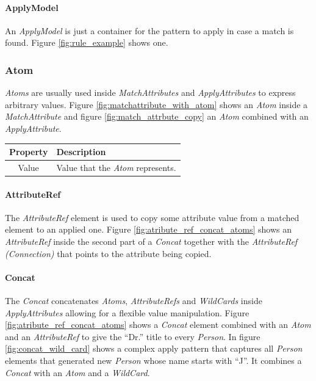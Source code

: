 \paragraph{ApplyModel}

An \emph{ApplyModel} is just a container for the pattern to apply in case a
match is found. Figure \ref{fig:rule_example} shows one.



\subsubsection{Atom}

\emph{Atoms} are usually used inside \emph{MatchAttributes} and
\emph{ApplyAttributes}  to express arbitrary values. Figure
\ref{fig:matchattribute_with_atom} shows an \emph{Atom} inside a
\emph{MatchAttribute} and figure \ref{fig:match_attrbute_copy} an \emph{Atom}
combined with an \emph{ApplyAttribute}. 

\begin{center}
  \begin{tabular}{ | c | p{\paragraphsize} | }
    \hline
    \textbf{Property} & \textbf{Description} \\ \hline
    Value & Value that the \emph{Atom} represents. \\ \hline
  \end{tabular}
\end{center}

\paragraph{AttributeRef}

The \emph{AttributeRef} element is used to copy some attribute value from a
matched element to an applied one. Figure \ref{fig:atribute_ref_concat_atoms}
shows an \emph{AttributeRef} inside the second part of a \emph{Concat} together
with the \emph{AttributeRef (Connection)} that points to the attribute being
copied.



\paragraph{Concat}

The \emph{Concat} concatenates \emph{Atoms}, \emph{AttributeRefs} and
\emph{WildCards} inside \emph{ApplyAttributes} allowing for a flexible value
 manipulation. Figure \ref{fig:atribute_ref_concat_atoms} shows a
\emph{Concat} element combined with an \emph{Atom} and an \emph{AttributeRef} to
give the ``Dr.'' title to every \emph{Person}. In figure
\ref{fig:concat_wild_card} shows a complex apply pattern that captures all
\emph{Person} elements that generated new \emph{Person} whose name starts with
``J''. It combines a \emph{Concat} with an \emph{Atom} and a \emph{WildCard}.

